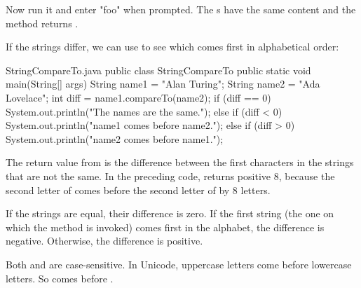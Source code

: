 Now run it and enter "foo" when prompted. The s have the same content and the  method returns .



If the strings differ, we can use  to see which comes first in alphabetical order:

\begin{trinket} [260] {StringCompareTo.java}
public class StringCompareTo {    
    public static void main(String[] args) {
       String name1 = "Alan Turing";
       String name2 = "Ada Lovelace";
       int diff = name1.compareTo(name2);
       if (diff == 0) {
          System.out.println("The names are the same.");
       } else if (diff < 0) {
          System.out.println("name1 comes before name2.");
       } else if (diff > 0) {
          System.out.println("name2 comes before name1.");
       }
    }
}
\end{trinket}

The return value from  is the difference between the first characters in the strings that are not the same.
In the preceding code,  returns positive 8, because the second letter of  comes before the second letter of  by 8 letters.

If the strings are equal, their difference is zero.
If the first string (the one on which the method is invoked) comes first in the alphabet, the difference is negative.
Otherwise, the difference is positive.


Both  and  are case-sensitive.
In Unicode, uppercase letters come before lowercase letters.
So  comes before .

